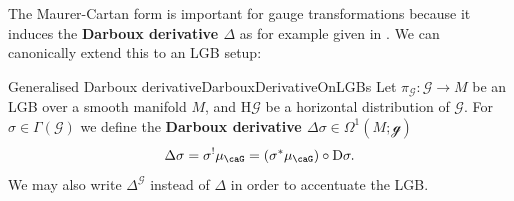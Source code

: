 \documentclass[reqno,a4paper,oneside]{amsart}
\newcommand\mutot{\mu_\caG}
\theoremstyle{plain}
\theoremstyle{remark}
\theoremstyle{definition}
\begin{document}
The Maurer-Cartan form is important for gauge transformations because it induces the \textbf{Darboux derivative $\Delta$} as for example given in \cite[\S 5.1, page 182ff.]{mackenzieGeneralTheory}. We can canonically extend this to an LGB setup:



\begin{definitions}{Generalised Darboux derivative}{DarbouxDerivativeOnLGBs}
Let $\pi_{\mathcal{G}} \colon \mathcal{G} \to M$ be an LGB over a smooth manifold $M$, and $\mathrm{H}\mathcal{G}$ be a horizontal distribution of $\mathcal{G}$.
For $\sigma \in \Gamma(\mathcal{G})$ we define the \textbf{Darboux derivative $\Delta \sigma \in \Omega^1(M; \mathcal{g})$}
\begin{equation*}
\Delta \sigma
=
\sigma^! \mutot
=
\mleft(\sigma^* \mutot \mright) \circ \mathrm{D}\sigma.
\end{equation*}
We may also write $\Delta^{\mathcal{G}}$ instead of $\Delta$ in order to accentuate the LGB.
\end{definitions}
\end{document}
